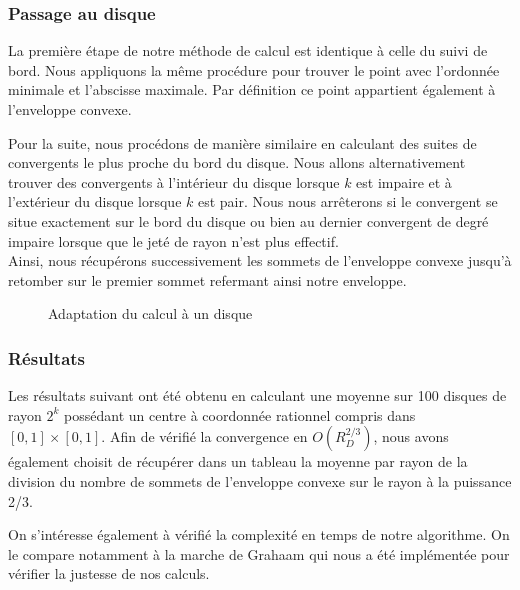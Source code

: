 
\subsubsection{Passage au disque}

La première étape de notre méthode de calcul est identique à celle du suivi de bord. Nous appliquons la même procédure pour trouver le point avec l'ordonnée minimale et l'abscisse maximale. Par définition ce point appartient également à l'enveloppe convexe. 

Pour la suite, nous procédons de manière similaire en calculant des suites de convergents le plus proche du bord du disque. Nous allons alternativement trouver des convergents à l'intérieur du disque lorsque $k$ est impaire et à l'extérieur du disque lorsque $k$ est pair. Nous nous arrêterons si le convergent se situe exactement sur le bord du disque ou bien au dernier convergent de degré impaire lorsque que le jeté de rayon n'est plus effectif.\\

Ainsi, nous récupérons successivement les sommets de l'enveloppe convexe jusqu'à retomber sur le premier sommet refermant ainsi notre enveloppe.

\begin{figure}[H]
  \centering
  \caption{Adaptation du calcul à un disque}
\end{figure}

\subsubsection{Résultats}

Les résultats suivant ont été obtenu en calculant une moyenne sur 100 disques de rayon $2^k$ possédant un centre à coordonnée rationnel compris dans $[0,1]\times[0,1]$. Afin de vérifié la convergence en $O(R_{D}^{2/3})$, nous avons également choisit de récupérer dans un tableau la moyenne par rayon de la division du nombre de sommets de l'enveloppe convexe sur le rayon à la puissance 2/3.

On s'intéresse également à vérifié la complexité en temps de notre algorithme. On le compare notamment à la marche de Grahaam qui nous a été implémentée pour vérifier la justesse de nos calculs. 

